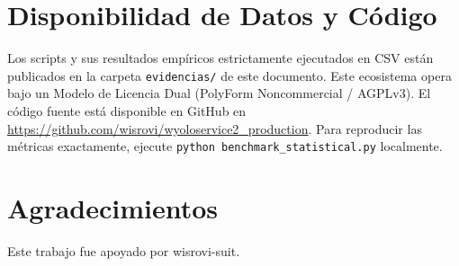 \documentclass[conference]{IEEEtran}
\begin{document}
\section*{Disponibilidad de Datos y Código}
Los scripts y sus resultados empíricos estrictamente ejecutados en CSV están publicados en la carpeta \texttt{evidencias/} de este documento. Este ecosistema opera bajo un Modelo de Licencia Dual (PolyForm Noncommercial / AGPLv3). El código fuente está disponible en GitHub en \url{https://github.com/wisrovi/wyoloservice2_production}. Para reproducir las métricas exactamente, ejecute \texttt{python benchmark\_statistical.py} localmente.

\section*{Agradecimientos}
Este trabajo fue apoyado por wisrovi-suit.



\end{document}
